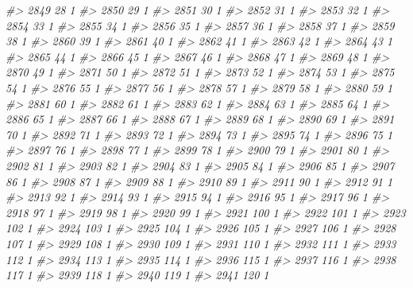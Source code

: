 \documentclass[]{article}
\newenvironment{Shaded}{\begin{snugshade}}{\end{snugshade}}
\newcommand{\CommentTok}[1]{\textcolor[rgb]{0.56,0.35,0.01}{\textit{#1}}}
\begin{document}
\begin{Shaded}
\begin{Highlighting}[]
\CommentTok{#> 2849  28  1}
\CommentTok{#> 2850  29  1}
\CommentTok{#> 2851  30  1}
\CommentTok{#> 2852  31  1}
\CommentTok{#> 2853  32  1}
\CommentTok{#> 2854  33  1}
\CommentTok{#> 2855  34  1}
\CommentTok{#> 2856  35  1}
\CommentTok{#> 2857  36  1}
\CommentTok{#> 2858  37  1}
\CommentTok{#> 2859  38  1}
\CommentTok{#> 2860  39  1}
\CommentTok{#> 2861  40  1}
\CommentTok{#> 2862  41  1}
\CommentTok{#> 2863  42  1}
\CommentTok{#> 2864  43  1}
\CommentTok{#> 2865  44  1}
\CommentTok{#> 2866  45  1}
\CommentTok{#> 2867  46  1}
\CommentTok{#> 2868  47  1}
\CommentTok{#> 2869  48  1}
\CommentTok{#> 2870  49  1}
\CommentTok{#> 2871  50  1}
\CommentTok{#> 2872  51  1}
\CommentTok{#> 2873  52  1}
\CommentTok{#> 2874  53  1}
\CommentTok{#> 2875  54  1}
\CommentTok{#> 2876  55  1}
\CommentTok{#> 2877  56  1}
\CommentTok{#> 2878  57  1}
\CommentTok{#> 2879  58  1}
\CommentTok{#> 2880  59  1}
\CommentTok{#> 2881  60  1}
\CommentTok{#> 2882  61  1}
\CommentTok{#> 2883  62  1}
\CommentTok{#> 2884  63  1}
\CommentTok{#> 2885  64  1}
\CommentTok{#> 2886  65  1}
\CommentTok{#> 2887  66  1}
\CommentTok{#> 2888  67  1}
\CommentTok{#> 2889  68  1}
\CommentTok{#> 2890  69  1}
\CommentTok{#> 2891  70  1}
\CommentTok{#> 2892  71  1}
\CommentTok{#> 2893  72  1}
\CommentTok{#> 2894  73  1}
\CommentTok{#> 2895  74  1}
\CommentTok{#> 2896  75  1}
\CommentTok{#> 2897  76  1}
\CommentTok{#> 2898  77  1}
\CommentTok{#> 2899  78  1}
\CommentTok{#> 2900  79  1}
\CommentTok{#> 2901  80  1}
\CommentTok{#> 2902  81  1}
\CommentTok{#> 2903  82  1}
\CommentTok{#> 2904  83  1}
\CommentTok{#> 2905  84  1}
\CommentTok{#> 2906  85  1}
\CommentTok{#> 2907  86  1}
\CommentTok{#> 2908  87  1}
\CommentTok{#> 2909  88  1}
\CommentTok{#> 2910  89  1}
\CommentTok{#> 2911  90  1}
\CommentTok{#> 2912  91  1}
\CommentTok{#> 2913  92  1}
\CommentTok{#> 2914  93  1}
\CommentTok{#> 2915  94  1}
\CommentTok{#> 2916  95  1}
\CommentTok{#> 2917  96  1}
\CommentTok{#> 2918  97  1}
\CommentTok{#> 2919  98  1}
\CommentTok{#> 2920  99  1}
\CommentTok{#> 2921 100  1}
\CommentTok{#> 2922 101  1}
\CommentTok{#> 2923 102  1}
\CommentTok{#> 2924 103  1}
\CommentTok{#> 2925 104  1}
\CommentTok{#> 2926 105  1}
\CommentTok{#> 2927 106  1}
\CommentTok{#> 2928 107  1}
\CommentTok{#> 2929 108  1}
\CommentTok{#> 2930 109  1}
\CommentTok{#> 2931 110  1}
\CommentTok{#> 2932 111  1}
\CommentTok{#> 2933 112  1}
\CommentTok{#> 2934 113  1}
\CommentTok{#> 2935 114  1}
\CommentTok{#> 2936 115  1}
\CommentTok{#> 2937 116  1}
\CommentTok{#> 2938 117  1}
\CommentTok{#> 2939 118  1}
\CommentTok{#> 2940 119  1}
\CommentTok{#> 2941 120  1}

\end{Highlighting}
\end{Shaded}
\end{document}

